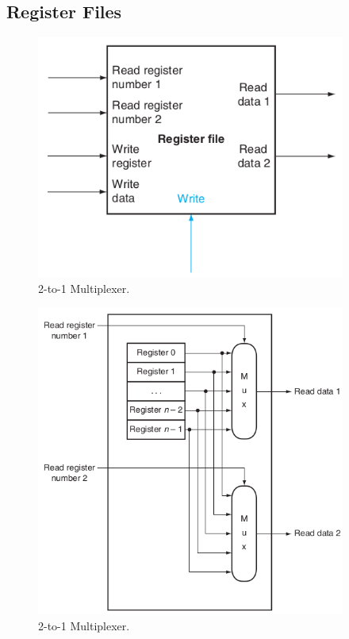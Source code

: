 \documentclass[a4paper, 11pt,oneside]{article}
\begin{document}
\subsection{Register Files}

\begin{figure}[H]
	\begin{center}
	\includegraphics[width=4in]{rf0.png}
	\caption{2-to-1 Multiplexer.}
	\label{fig:mux} 
	\end{center}
\end{figure}

\begin{figure}[H]
	\begin{center}
	\includegraphics[width=4in]{rf1.png}
	\caption{2-to-1 Multiplexer.}
	\label{fig:mux} 
	\end{center}
\end{figure}
\end{document}
